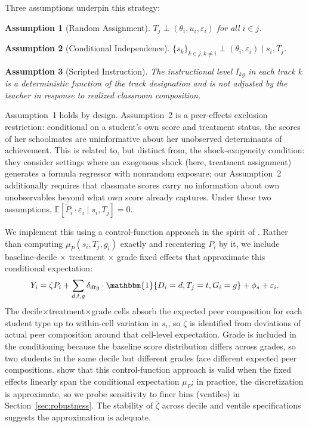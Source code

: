 \documentclass[11pt]{article}
\newtheorem{assumption}{Assumption}
\newcommand{\ind}{\mathbbm{1}}
\newcommand{\E}{\mathbb{E}}
\begin{document}
Three assumptions underpin this strategy:

\begin{assumption}[Random Assignment]
$T_j \perp (\theta_i, u_i, \varepsilon_i)$ for all $i \in j$.
\end{assumption}

\begin{assumption}[Conditional Independence]
$\{s_k\}_{k \in j, k \neq i} \perp (\theta_i, \varepsilon_i) \mid s_i, T_j$.
\end{assumption}

\begin{assumption}[Scripted Instruction]
The instructional level $I_{kg}$ in each track $k$ is a deterministic function of the track designation and is not adjusted by the teacher in response to realized classroom composition.
\end{assumption}

\noindent Assumption~1 holds by design. Assumption~2 is a peer-effects exclusion restriction: conditional on a student's own score and treatment status, the scores of her schoolmates are uninformative about her unobserved determinants of achievement. This is related to, but distinct from, the \citet{borusyak2023nonrandom} shock-exogeneity condition: they consider settings where an exogenous shock (here, treatment assignment) generates a formula regressor with nonrandom exposure; our Assumption~2 additionally requires that classmate scores carry no information about own unobservables beyond what own score already captures. Under these two assumptions, $\E[\tilde{P}_i \cdot \varepsilon_i \mid s_i, T_j] = 0$.

We implement this using a control-function approach in the spirit of \citet{borusyak2023nonrandom}. Rather than computing $\mu_P(s_i, T_j, g_i)$ exactly and recentering $P_i$ by it, we include baseline-decile $\times$ treatment $\times$ grade fixed effects that approximate this conditional expectation:
\begin{equation}
\label{eq:bh}
Y_i = \zeta P_i + \sum_{d,t,g} \delta_{dtg} \cdot \ind\{D_i = d, T_j = t, G_i = g\} + \phi_s + \varepsilon_i.
\end{equation}
The decile$\times$treatment$\times$grade cells absorb the expected peer composition for each student type up to within-cell variation in $s_i$, so $\zeta$ is identified from deviations of actual peer composition around that cell-level expectation. Grade is included in the conditioning because the baseline score distribution differs across grades, so two students in the same decile but different grades face different expected peer compositions. \citeauthor{borusyak2023nonrandom} show that this control-function approach is valid when the fixed effects linearly span the conditional expectation $\mu_P$; in practice, the discretization is approximate, so we probe sensitivity to finer bins (ventiles) in Section~\ref{sec:robustness}. The stability of $\hat{\zeta}$ across decile and ventile specifications suggests the approximation is adequate.
\end{document}
